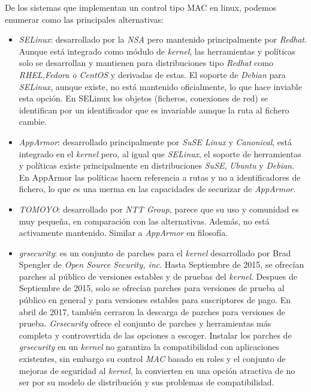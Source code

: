 De los sistemas que implementan un control tipo MAC en linux, podemos enumerar como las principales alternativas:

\begin{itemize}
    \item \emph{SELinux}: desarrollado por la \emph{NSA} pero mantenido principalmente por \emph{Redhat}. Aunque está integrado como módulo de \emph{kernel},
    las herramientas y políticas solo se desarrollan y mantienen para distribuciones tipo \emph{Redhat} como \emph{RHEL,Fedora o CentOS} y derivadas de estas.
    El soporte de \emph{Debian} para \emph{SELinux}, aunque existe, no está mantenido oficialmente, lo que hace inviable esta opción. En SELinux los objetos (ficheros, conexiones de red) se identifican por
    un identificador que es invariable aunque la ruta al fichero cambie. 
    \item \emph{AppArmor}: desarrollado principalmente por \emph{SuSE Linux} y \emph{Canonical}, está integrado en el \emph{kernel} pero, al igual que \emph{SELinux}, 
    el soporte de herramientas y políticas existe principalmente en distribuciones \emph{SuSE}, \emph{Ubuntu} y \emph{Debian}. En AppArmor las políticas hacen referencia a rutas y no 
    a identificadores de fichero, lo que es una merma en las capacidades de securizar de \emph{AppArmor}.
    \item \emph{TOMOYO}: desarrollado por \emph{NTT Group}, parece que su uso y comunidad es muy pequeña, en comparación con las alternativas. Además, no está activamente mantenido. Similar a \emph{AppArmor} en filosofía.
    \item \emph{grsecurity}: es un conjunto de parches para el \emph{kernel} desarrollado por Brad Spengler de \emph{Open Source Security, inc}. Hasta Septiembre de 2015, se ofrecían parches al público de versiones estables y de pruebas del \emph{kernel}. 
    Despues de Septiembre de 2015, solo se ofrecían parches para versiones de prueba al público en general y para versiones estables para suscriptores de pago. En abril de 2017, también cerraron la descarga de parches
    para versiones de prueba. \emph{Grsecurity} ofrece el conjunto de parches y herramientas más completa y controvertida de las opciones a escoger. Instalar los parches de \emph{grsecurity} en un \emph{kernel}
    no garantiza la compatibilidad con aplicaciones existentes, sin embargo su control \emph{MAC} basado en roles y el conjunto de mejoras de seguridad al \emph{kernel}, la convierten en una opción atractiva de no ser por su modelo de distribución y sus problemas de compatibilidad.
\end{itemize}

